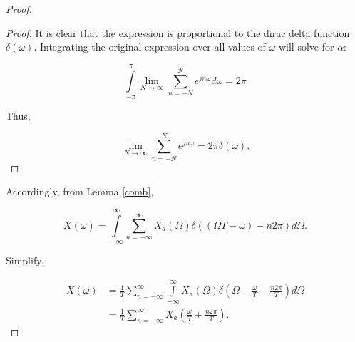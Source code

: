 \begin{proof}
\begin{proof}
It is clear that the expression is proportional to the dirac delta function $\delta(\omega)$. Integrating the original expression over all values of $\omega$ will solve for $\alpha$:

\begin{equation}
\int\limits_{ - \pi }^\pi  {\mathop {\lim }\limits_{N \to \infty } \sum\limits_{n =  - N}^N {{e^{jn\omega }}} } d\omega  = 2\pi 
\end{equation}

Thus,

\begin{equation}
\mathop {\lim }\limits_{N \to \infty } \sum\limits_{n =  - N}^N {{e^{jn\omega }}} = 2 \pi \delta(\omega). 
\end{equation}
\end{proof}

Accordingly, from Lemma \ref{comb},

\begin{equation}
X\left( \omega  \right) = \int\limits_{ - \infty }^\infty  {\sum\limits_{n =  - \infty }^\infty  {{X_a}\left( \Omega  \right)\delta \left( {\left( {\Omega T - \omega } \right) - n2\pi } \right)} d\Omega }.
\end{equation}

Simplify,

\begin{equation}
\begin{aligned}
X\left( \omega  \right) &= \frac{1}{T}\sum\limits_{n =  - \infty }^\infty  {\int\limits_{ - \infty }^\infty  {{X_a}\left( \Omega  \right)\delta \left( {\Omega  - \frac{\omega }{T} - \frac{{n2\pi }}{T}} \right)d\Omega } } \\
 &= \frac{1}{T}\sum\limits_{n =  - \infty }^\infty  {{X_a}\left( {\frac{\omega }{T} + \frac{{n2\pi }}{T}} \right)} .
\end{aligned}
\end{equation}
\end{proof}
